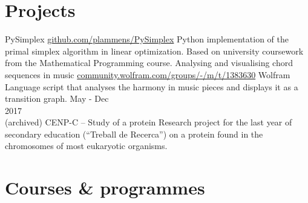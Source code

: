 \documentclass[]{resume}
\begin{document}
\begin{adjustwidth}{10pt}{10pt}
\section*{Projects}

\renewcommand{\twentylen}{\itemwidth}
\begin{twenty}[\chronowidth]
      {PySimplex}
      {\href{https://github.com/plammens/PySimplex}{github.com/plammens/PySimplex}}
      {Python implementation of the primal simplex algorithm in linear optimization. Based on university coursework from the Mathematical Programming course.}
      {Analysing and visualising chord sequences in music}
      {\href{https://community.wolfram.com/groups/-/m/t/1383630}{community.wolfram.com/groups/-/m/t/1383630}}
      {Wolfram Language script that analyses the harmony in music pieces and displays it as a transition graph.}
  \twentyitem
      {May - Dec \\ 2017 \\ (archived)}
      {CENP-C – Study of a protein}
      {}
      {Research project for the last year of secondary education (“Treball de Recerca”) on a protein found in the chromosomes of most eukaryotic organisms.}
\end{twenty}



\section*{Courses \& programmes}


\end{adjustwidth}
\end{document}
